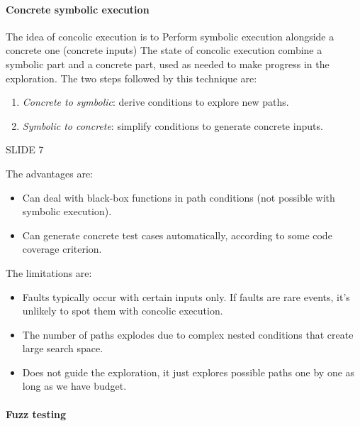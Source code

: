 \paragraph*{Concrete symbolic execution}
The idea of concolic execution is to Perform symbolic execution alongside a concrete one (concrete inputs)
The state of concolic execution combine a symbolic part and a concrete part, used as needed to make progress in the exploration. 
The two steps followed by this technique are: 
\begin{enumerate}
    \item \textit{Concrete to symbolic}: derive conditions to explore new paths. 
    \item \textit{Symbolic to concrete}: simplify conditions to generate concrete inputs. 
\end{enumerate}
\begin{example}
    SLIDE 7
\end{example}
The advantages are: 
\begin{itemize}
    \item Can deal with black-box functions in path conditions (not possible with symbolic execution). 
    \item Can generate concrete test cases automatically, according to some code coverage criterion. 
\end{itemize} 
The limitations are: 
\begin{itemize}
    \item Faults typically occur with certain inputs only. 
        If faults are rare events, it's unlikely to spot them with concolic execution. 
    \item The number of paths explodes due to complex nested conditions that create large search space. 
    \item Does not guide the exploration, it just explores possible paths one by one as long as we have budget. 
\end{itemize}

\paragraph*{Fuzz testing}